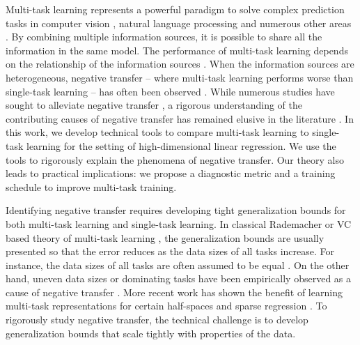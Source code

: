 Multi-task learning represents a powerful paradigm to solve complex prediction tasks in computer vision \cite{chexnet17,ZSSGM18}, natural language processing \cite{GLUE,superglue} and numerous other areas \cite{ZY17}.
By combining multiple information sources, it is possible to share all the information in the same model.
The performance of multi-task learning depends on the relationship of the information sources \cite{C97}.
When the information sources are heterogeneous, negative transfer -- where multi-task learning performs worse than single-task learning -- has often been observed \cite{AP16,BS17}.
While numerous studies have sought to alleviate negative transfer \cite{ZY17}, a rigorous understanding of the contributing causes of negative transfer has remained elusive in the literature \cite{R17}.
In this work, we develop technical tools to compare multi-task learning to single-task learning for the setting of high-dimensional linear regression. %
We use the tools to rigorously explain the phenomena of negative transfer.
Our theory also leads to practical implications: we propose a diagnostic metric and a training schedule to improve multi-task training.

Identifying negative transfer requires developing tight generalization bounds for both multi-task learning and single-task learning.
In classical Rademacher or VC based theory of multi-task learning \cite{B00,AZ05,M06}, the generalization bounds are usually presented so that the error reduces as the data sizes of all tasks increase.
For instance, the data sizes of all tasks are often assumed to be equal \cite{B00}.
On the other hand, uneven data sizes or dominating tasks have been empirically observed as a cause of negative transfer \cite{YKGLHF20}.
More recent work has shown the benefit of learning multi-task representations for certain half-spaces \cite{MPR16} and sparse regression \cite{LPTV09,LPVT11}.
To rigorously study negative transfer, the technical challenge is to develop generalization bounds that scale tightly with properties of the data.


